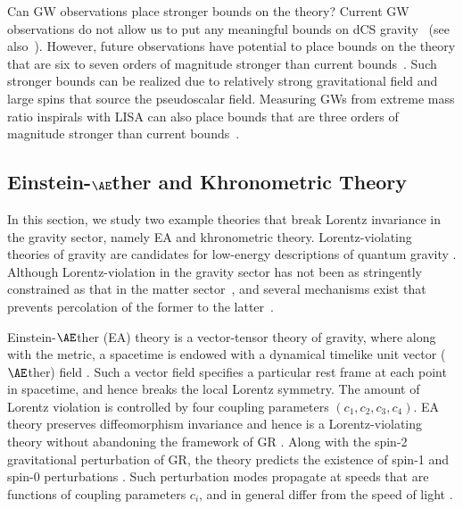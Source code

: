 \documentclass[prd,twocolumn,nofootinbib]{revtex4-1}
\begin{document}
Can GW observations place stronger bounds on the theory? Current GW observations do not allow us to put any meaningful bounds on dCS gravity~\cite{Yunes:2016jcc} (see also~\cite{Yagi:2017zhb}). However, future observations have potential to place bounds on the theory that are six to seven orders of magnitude stronger than current bounds~\cite{Yagi:2012vf}. Such stronger bounds can be realized due to relatively strong gravitational field and large spins that source the pseudoscalar field. Measuring GWs from extreme mass ratio inspirals with LISA can also place bounds that are three orders of magnitude stronger than current bounds~\cite{Canizares:2012is}. 


 \subsection{Einstein-$\AE$ther  and Khronometric Theory}

In this section, we study two example theories that break Lorentz invariance in the gravity sector, namely EA and khronometric theory. Lorentz-violating theories of gravity are candidates for low-energy descriptions of quantum gravity \cite{Blas:2014aca,Horava:2009uw}. Although Lorentz-violation in the gravity sector has not been as stringently constrained as that in the matter sector~\cite{Mattingly:2005re,Jacobson:2005bg,Liberati:2013xla}, and several mechanisms exist that prevents percolation of the former to the latter~\cite{Liberati:2013xla,Pospelov:2010mp}.
 
 Einstein-$\AE$ther (EA) theory is a vector-tensor theory of gravity, where along with the metric, a spacetime is endowed with a dynamical timelike unit vector ($\AE$ther) field \cite{Jacobson:2000xp,Jacobson:2008aj}. Such a vector field specifies a particular rest frame at each point in spacetime, and hence breaks the local Lorentz symmetry. The amount of Lorentz violation is controlled by four coupling parameters 
$(c_1,c_2,c_3,c_4)$. EA theory preserves diffeomorphism invariance and hence is a Lorentz-violating theory without abandoning the framework of GR \cite{Jacobson:2008aj}. 
%
Along with the spin-2 gravitational perturbation of GR, the theory predicts the existence of spin-1 and spin-0 perturbations \cite{Foster:2006az,Jacobson:2004ts,PhysRevD.76.084033}. Such perturbation modes propagate at speeds that are functions of coupling parameters $c_i$, and in general differ from the speed of light \cite{Jacobson:2004ts}. 
 
\end{document}
